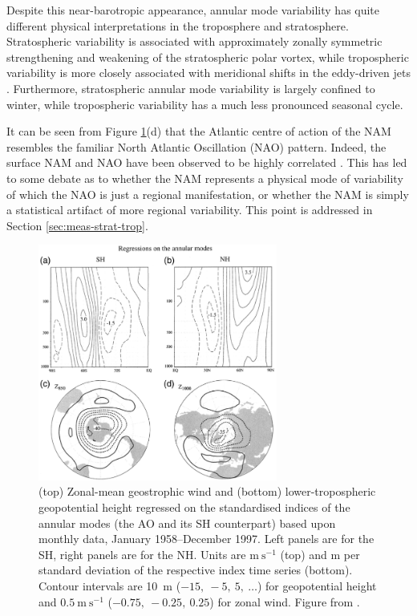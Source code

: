 Despite this near-barotropic appearance, annular mode variability has quite
different physical interpretations in the troposphere and
stratosphere. Stratospheric variability is associated with approximately zonally
symmetric strengthening and weakening of the stratospheric polar vortex, while
tropospheric variability is more closely associated with meridional shifts in
the eddy-driven jets \citep{Limpasuvan1999}. Furthermore, stratospheric annular
mode variability is largely confined to winter, while tropospheric variability
has a much less pronounced seasonal cycle.

It can be seen from Figure \ref{fig:annular_modes}(d) that the Atlantic centre
of action of the NAM resembles the familiar North Atlantic Oscillation (NAO)
pattern. Indeed, the surface NAM and NAO have been observed to be highly
correlated \citep{Ambaum2001}. This has led to some debate as to whether the NAM
represents a physical mode of variability of which the NAO is just a regional
manifestation, or whether the NAM is simply a statistical artifact of more
regional variability. This point is addressed in Section
\ref{sec:meas-strat-trop}.

\begin{figure}
 \centering
 \noindent\includegraphics[width=0.7\textwidth]{figures/chapter-intro/annular_modes_TW2.png}
 \caption[Annular mode patterns from \citet{Thompson2000a}]{(top) Zonal-mean
   geostrophic wind and (bottom) lower-tropospheric geopotential height
   regressed on the standardised indices of the annular modes (the AO and its SH
   counterpart) based upon monthly data, January 1958--December 1997. Left
   panels are for the SH, right panels are for the NH. Units are
   $\mathrm{m~s^{-1}}$ (top) and m per standard deviation of the respective
   index time series (bottom). Contour intervals are 10~m ($-15,~-5,~5,~\dots$)
   for geopotential height and $\mathrm{0.5~m~s^{-1}}$ ($-0.75,~-0.25,~0.25$)
   for zonal wind. Figure from \citet{Thompson2000a}.}
 \label{fig:annular_modes}
\end{figure}


